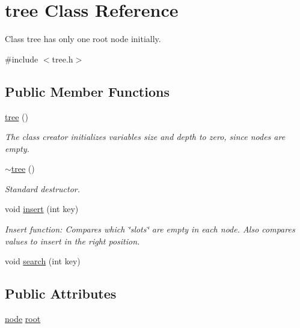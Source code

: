 \hypertarget{classtree}{\section{tree \-Class \-Reference}
\label{classtree}
}


\-Class tree has only one root node initially.  




{\ttfamily \#include $<$tree.\-h$>$}

\subsection*{\-Public \-Member \-Functions}
\begin{DoxyCompactItemize}
\item 
\hyperlink{classtree_a9f2a566ac2710fafc31232456780e82d}{tree} ()
\begin{DoxyCompactList}\small\item\em \-The class creator initializes variables size and depth to zero, since nodes are empty. \end{DoxyCompactList}\item 
\hyperlink{classtree_a05f3faa3c9a8f6fed237e2d0f6172244}{$\sim$tree} ()
\begin{DoxyCompactList}\small\item\em \-Standard destructor. \end{DoxyCompactList}\item 
void \hyperlink{classtree_ae07bbaa33c8998156793025197f94a7e}{insert} (int key)
\begin{DoxyCompactList}\small\item\em \-Insert function\-: \-Compares which \char`\"{}slots\char`\"{} are empty in each node. \-Also compares values to insert in the right position. \end{DoxyCompactList}\item 
void \hyperlink{classtree_a70b27ff892cb18aac183f210148a84fa}{search} (int key)
\end{DoxyCompactItemize}
\subsection*{\-Public \-Attributes}
\begin{DoxyCompactItemize}
\item 
\hyperlink{structnode}{node} \hyperlink{classtree_aa9cfd84afe70806aeca40a8e15cd7b84}{root}
\end{DoxyCompactItemize}


